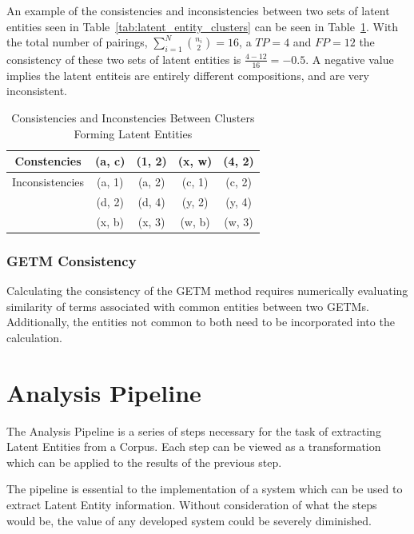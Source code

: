 \documentclass[10pt]{report}
\begin{document}
An example of the consistencies and inconsistencies between two sets of latent entities seen in Table~\ref{tab:latent_entity_clusters} can be seen in Table~\ref{tab:latent_entity_consistencies}. With the total number of pairings, $\sum^{N}_{i=1}{n_i\choose2} = 16$, a $TP=4$ and $FP=12$ the consistency of these two sets of latent entities is $\frac{4-12}{16} = -0.5$. A negative value implies the latent entiteis are entirely different compositions, and are very inconsistent.

\begin{table}
  \centering
  \begin{tabular}{c | c c c c}
    Constencies
    & (a, c) 
    & (1, 2) 
    & (x, w) 
    & (4, 2)
    \\
    \hline
    Inconsistencies
         & (a, 1) 
         & (a, 2) 
         & (c, 1)                      
         & (c, 2)
         \\
         & (d, 2) 
         & (d, 4) 
         & (y, 2) 
         & (y, 4)
         \\
         & (x, b) 
         & (x, 3) 
         & (w, b) 
         & (w, 3) 
  \end{tabular}
  \caption{Consistencies and Inconstencies Between Clusters Forming Latent Entities\label{tab:latent_entity_consistencies}}
\end{table}


\subsubsection{GETM Consistency}
Calculating the consistency of the GETM method requires numerically evaluating similarity of terms associated with common entities between two GETMs. Additionally, the entities not common to both need to be incorporated into the calculation.




\section{Analysis Pipeline}
The Analysis Pipeline is a series of steps necessary for the task of extracting Latent Entities from a Corpus. Each step can be viewed as a transformation which can be applied to the results of the previous step.

The pipeline is essential to the implementation of a system which can be used to extract Latent Entity information. Without consideration of what the steps would be, the value of any developed system could be severely diminished.
\end{document}
